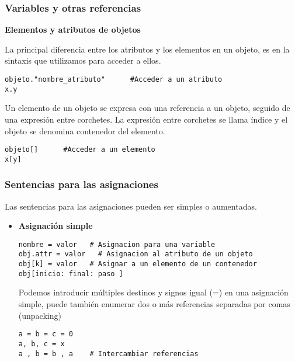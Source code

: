 \documentclass[10pt]{beamer}
\begin{document}
\begin{frame}[fragile]
\frametitle{Variables y otras referencias}


\textbf{Elementos y atributos de objetos}

\vspace{0.2cm}

La principal diferencia entre  los atributos y los elementos en un objeto, es en la sintaxis que utilizamos para acceder a ellos.

\vspace{0.2cm}

\begin{lstlisting}
objeto."nombre_atributo"      #Acceder a un atributo
x.y                     
\end{lstlisting}

\vspace{0.2cm}

Un elemento de un objeto se expresa con una referencia a un objeto, seguido de una expresi\'on entre corchetes. La expresi\'on entre corchetes se llama \'indice y el objeto se denomina contenedor del elemento.

\vspace{0.2cm}

\begin{lstlisting}
objeto[]      #Acceder a un elemento
x[y]                     
\end{lstlisting}

\end{frame}

\begin{frame}[fragile]
\frametitle{Sentencias para las asignaciones}

Las sentencias para las asignaciones pueden ser simples o aumentadas.

\vspace{0.2cm}

\begin{itemize}
\item \textbf{Asignaci\'on simple}

\vspace{0.2cm}

\begin{lstlisting}
nombre = valor   # Asignacion para una variable
obj.attr = valor   # Asignacion al atributo de un objeto
obj[k] = valor   # Asignar a un elemento de un contenedor 
obj[inicio: final: paso ]                      
\end{lstlisting}

\vspace{0.2cm}

Podemos introducir m\'ultiples destinos y signos igual (=) en una asignaci\'on simple, puede tambi\'en enumerar dos o m\'as referencias separadas por comas (unpacking)

\vspace{0.2cm}

\begin{lstlisting}
a = b = c = 0
a, b, c = x
a , b = b , a    # Intercambiar referencias
\end{lstlisting}
\end{itemize}


\end{frame}
\end{document}
